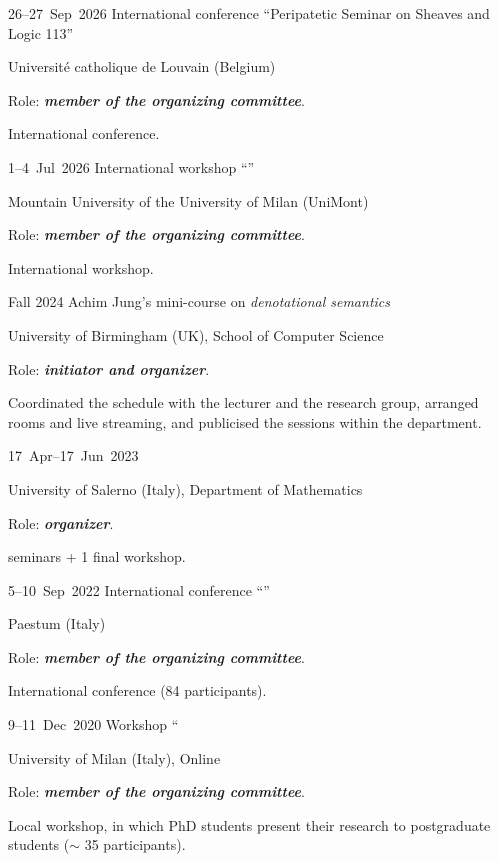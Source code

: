 
\chronorow
  {26--27~Sep~2026}
  {International conference ``Peripatetic Seminar on Sheaves and Logic 113''}
  {\textcolor{secondary}{Université catholique de Louvain (Belgium)}\par
   Role: \textbf{\emph{member of the organizing committee}}.\par
   \gray International conference.}

\chronorow
  {1--4~Jul~2026}
  {International workshop ``''}
  {\textcolor{secondary}{Mountain University of the University of Milan (UniMont)}\par
   Role: \textbf{\emph{member of the organizing committee}}.\par
   \gray International workshop.}

\chronorow
  {Fall 2024}
  {Achim Jung's mini-course on \textit{denotational semantics}}
  {\textcolor{secondary}{University of Birmingham (UK), School of Computer Science}\par
   Role: \textbf{\emph{initiator and organizer}}.\par
   \gray Coordinated the schedule with the lecturer and the research group, arranged rooms and live
   streaming, and publicised the sessions within the department.}

\chronorow
  {17~Apr--\allowbreak{}17~Jun~2023}
  {}
  {\textcolor{secondary}{University of Salerno (Italy), Department of Mathematics}\par
   Role: \textbf{\emph{organizer}}.\par
    seminars + 1 final workshop.}

\chronorow
  {5--10~Sep~2022}
  {International conference ``''}
  {\textcolor{secondary}{Paestum (Italy)}\par
   Role: \textbf{\emph{member of the organizing committee}}.\par
   \gray International conference (84 participants).}

\chronorow
  {9--11~Dec~2020}
  {Workshop ``}
  {\textcolor{secondary}{University of Milan (Italy), Online}\par
   Role: \emph{\textbf{member of the organizing committee}}.\par
   \gray Local workshop, in which PhD students present their research to postgraduate students ($\sim$ 35
   participants).}
